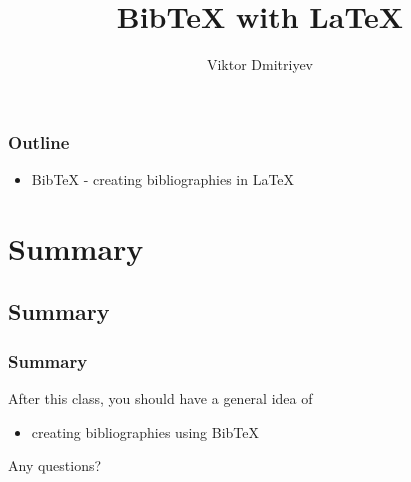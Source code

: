 \documentclass[slidestop,compress,mathserif]{beamer}
\title{BibTeX with LaTeX}
\subtitle{}
\author{Viktor Dmitriyev}
\institute{Adapter from Mini Course on LaTeX by \href{https://github.com/OpenIntroOrg/mini-course-materials}{David Diez}}
\date{}
\begin{document}
\newenvironment{act}[1]{{\color{command}#1}}{}
\newcommand{\lcom}[1]{{\color{command}$\backslash$#1}}
\newcommand{\larg}[1]{{\color{braces}$\{${\color{black}#1}$\}$}}
\newcommand{\mathText}[1]{{\color{braces}\${\color{black}#1}\$}}


\frame{ \titlepage }

\begin{frame}
  \frametitle{Outline}
  \begin{itemize}
  \item BibTeX - creating bibliographies in LaTeX
  \end{itemize}
\end{frame}



\section[Summary]{Summary}
\subsection[Summary]{Summary}

\begin{frame}  \frametitle{Summary}
After this class, you should have a general idea of
\vspace{1mm} \\
\begin{itemize}
	\item creating bibliographies using BibTeX
\end{itemize}
\vspace{1mm}
Any questions?
\end{frame}
\end{document}
